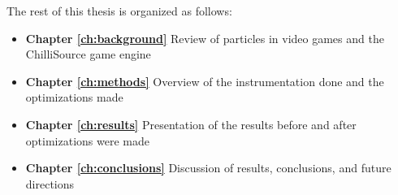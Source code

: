 The rest of this thesis is organized as follows:

\begin{itemize}


\item \textbf{Chapter \ref{ch:background}} Review of particles in video games and the ChilliSource game engine

\item \textbf{Chapter \ref{ch:methods}} Overview of the instrumentation done and the optimizations made

\item \textbf{Chapter \ref{ch:results}} Presentation of the results before and after optimizations were made

\item \textbf{Chapter \ref{ch:conclusions}} Discussion of results, conclusions, and future directions

\end{itemize}

